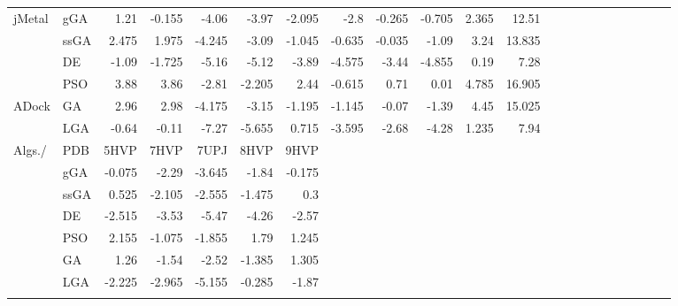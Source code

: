 \begin{table}
\begin{tabular}{ll|rrrrrrrrrrrrrrrrrrrr}
		\multirow{4}{*}{jMetal} &           gGA	 &1.21&-0.155&-4.06&-3.97&-2.095&-2.8&-0.265&-0.705&2.365&12.51\\
		\multirow{4}{*}{} &           ssGA & 2.475&1.975&-4.245&-3.09&-1.045&-0.635&-0.035&-1.09&3.24&13.835\\
		\multirow{4}{*}{} &           DE	 &\cellcolor{gray25} -1.09&\cellcolor{gray25}-1.725&-5.16&-5.12&\cellcolor{gray25}-3.89&\cellcolor{gray25}-4.575&\cellcolor{gray25}-3.44&\cellcolor{gray25}-4.855&\cellcolor{gray25}0.19&\cellcolor{gray25}7.28\\
		\multirow{4}{*}{} &           PSO	 & 3.88&3.86&-2.81&-2.205&2.44&-0.615&0.71&0.01&4.785&16.905\\
		\hline
		\multirow{2}{*}{ADock} &           GA	 &2.96&2.98&-4.175&-3.15&-1.195&-1.145&-0.07&-1.39&4.45&15.025\\
		\multirow{2}{*}{} &           LGA  &-0.64&-0.11&\cellcolor{gray25}-7.27&\cellcolor{gray25}-5.655&0.715&-3.595&-2.68&-4.28&1.235&7.94\\
		\hline
		\hline	
		Algs./ & PDB &5HVP&7HVP&7UPJ&8HVP&9HVP& & &&&\\
		\hhline{--|-----~~~~~}
		
		\multirow{4}{*}{jMetal} &           gGA	 &-0.075&-2.29&-3.645&-1.84&-0.175& & &&& \\
		\multirow{4}{*}{} &           ssGA & 0.525&-2.105&-2.555&-1.475&0.3& &  & \\
		\multirow{4}{*}{} &           DE	 &\cellcolor{gray25} -2.515&\cellcolor{gray25}-3.53&\cellcolor{gray25}-5.47&\cellcolor{gray25}-4.26&\cellcolor{gray25}-2.57&  & &\\
		\multirow{4}{*}{} &           PSO	 & 2.155&-1.075&-1.855&1.79&1.245&  & \\
		\hhline{--|-----~~~~~}
		\multirow{2}{*}{ADock} &           GA	 &1.26&-1.54&-2.52&-1.385&1.305& & \\
		\multirow{2}{*}{} &           LGA  &-2.225&-2.965&-5.155&-0.285&-1.87& &  \\
		\hhline{--|-----~~~~~}
	\end{tabular}
\end{table}


